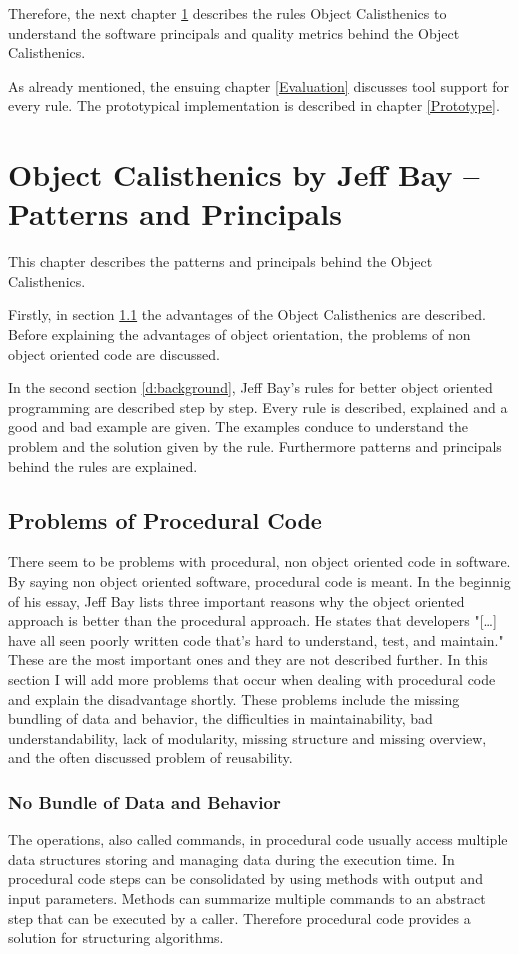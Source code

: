 Therefore, the next chapter  \ref{Description} describes the rules Object Calisthenics to understand the software principals and quality metrics behind the Object Calisthenics. 

As already mentioned, the ensuing chapter \ref{Evaluation} discusses tool support for every rule.  The prototypical implementation is described in chapter \ref{Prototype}.

\chapter{Object Calisthenics by Jeff Bay -- Patterns and Principals}
\label{Description}
This chapter describes the patterns and principals behind the Object Calisthenics. 

Firstly, in section \ref{d:problemsprocedural} the advantages of the Object Calisthenics are described. Before explaining the advantages of object orientation, the problems of non object oriented code are discussed. 

In the second section \ref{d:background}, Jeff Bay's rules for better object oriented programming are described step by step. Every rule is described, explained and a good and bad example are given. The examples conduce to understand the problem and the solution given by the rule. Furthermore patterns and principals behind the rules are explained. 

\section{Problems of Procedural Code}
\label{d:problemsprocedural}
There seem to be problems with procedural, non object oriented code in software. By saying non object oriented software, procedural code is meant. In the beginnig of his essay, Jeff Bay lists three important reasons why the object oriented approach is better than the procedural approach. He states that developers "[\dots] have all seen poorly written code that's hard to understand, test, and maintain." \cite[p. 70]{oc2008} These are the most important ones and they are not described further. In this section I will add more problems that occur when dealing with procedural code and explain the disadvantage shortly. These problems include the missing bundling of data and behavior, the difficulties in maintainability, bad understandability, lack of modularity, missing structure and missing overview, and the often discussed problem of reusability.

\subsection*{No Bundle of Data and Behavior}
The operations, also called commands, in procedural code usually access multiple data structures storing and managing data during the execution time. In procedural code steps can be consolidated by using methods with output and input parameters. Methods can summarize multiple commands to an abstract step that can be executed by a caller. Therefore procedural code provides a solution for structuring algorithms.\\

